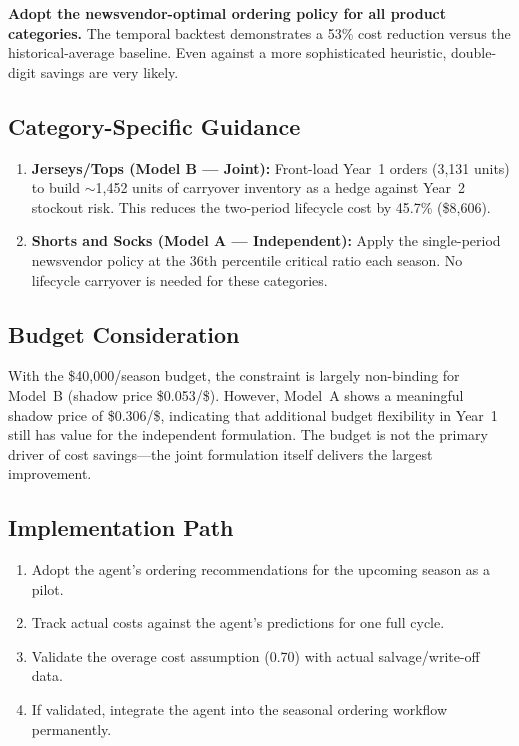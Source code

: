 \documentclass[11pt, letterpaper]{article}
\begin{document}
\textbf{Adopt the newsvendor-optimal ordering policy for all product categories.} The temporal backtest demonstrates a 53\% cost reduction versus the historical-average baseline. Even against a more sophisticated heuristic, double-digit savings are very likely.

\subsection{Category-Specific Guidance}

\begin{enumerate}
    \item \textbf{Jerseys/Tops (Model B --- Joint):} Front-load Year~1 orders (3,131 units) to build $\sim$1,452 units of carryover inventory as a hedge against Year~2 stockout risk. This reduces the two-period lifecycle cost by 45.7\% (\$8,606).

    \item \textbf{Shorts and Socks (Model A --- Independent):} Apply the single-period newsvendor policy at the 36th percentile critical ratio each season. No lifecycle carryover is needed for these categories.
\end{enumerate}

\subsection{Budget Consideration}

With the \$40,000/season budget, the constraint is largely non-binding for Model~B (shadow price \$0.053/\$). However, Model~A shows a meaningful shadow price of \$0.306/\$, indicating that additional budget flexibility in Year~1 still has value for the independent formulation. The budget is not the primary driver of cost savings---the joint formulation itself delivers the largest improvement.

\subsection{Implementation Path}

\begin{enumerate}[nosep]
    \item Adopt the agent's ordering recommendations for the upcoming season as a pilot.
    \item Track actual costs against the agent's predictions for one full cycle.
    \item Validate the overage cost assumption (0.70) with actual salvage/write-off data.
    \item If validated, integrate the agent into the seasonal ordering workflow permanently.
\end{enumerate}
\end{document}
